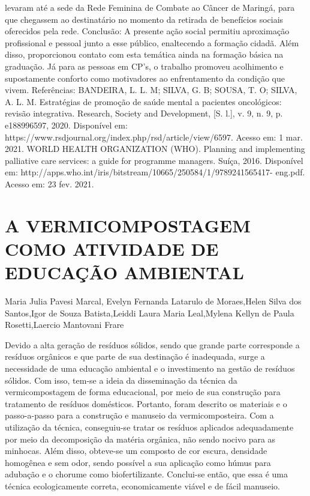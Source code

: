 levaram até a sede da Rede Feminina de Combate ao Câncer de Maringá, para que chegassem ao
destinatário no momento da retirada de benefícios sociais oferecidos pela rede. Conclusão: A
presente ação social permitiu aproximação profissional e pessoal junto a esse público,
enaltecendo a formação cidadã. Além disso, proporcionou contato com esta temática ainda na
formação básica na graduação. Já para as pessoas em CP’s, o trabalho promoveu acolhimento e
supostamente conforto como motivadores ao enfrentamento da condição que vivem.
Referências:
BANDEIRA, L. L. M; SILVA, G. B; SOUSA, T. O; SILVA, A. L. M. Estratégias de promoção
de saúde mental a pacientes oncológicos: revisão integrativa. Research, Society and
Development, [S. l.], v. 9, n. 9, p. e188996597, 2020. Disponível em:
https://www.rsdjournal.org/index.php/rsd/article/view/6597. Acesso em: 1 mar. 2021.
WORLD HEALTH ORGANIZATION (WHO). Planning and implementing palliative care
services: a guide for programme managers. Suíça, 2016. Disponível em:
http://apps.who.int/iris/bitstream/10665/250584/1/9789241565417- eng.pdf. Acesso em: 23 fev.
2021.



\section{A VERMICOMPOSTAGEM COMO ATIVIDADE DE EDUCAÇÃO AMBIENTAL}

Maria Julia Pavesi Marcal, Evelyn Fernanda Latarulo de Moraes,Helen Silva dos Santos,Igor de Souza Batista,Leiddi Laura Maria Leal,Mylena Kellyn de Paula Rosetti,Laercio Mantovani Frare

Devido a alta geração de resíduos sólidos, sendo que grande parte corresponde a resíduos orgânicos e que parte de sua destinação é inadequada, surge a necessidade de uma educação ambiental e o investimento na gestão de resíduos sólidos. Com isso, tem-se a ideia da disseminação da técnica da vermicompostagem de forma educacional, por meio de sua construção para tratamento de  resíduos domésticos. Portanto, foram descrito os materiais e o passo-a-passo para a construção e manuseio da vermicomposteira. Com a utilização da técnica, conseguiu-se tratar os resíduos aplicados adequadamente por meio da decomposição da matéria orgânica, não sendo nocivo para as minhocas. Além disso, obteve-se um  composto de cor escura, densidade homogênea e sem odor, sendo possível a sua aplicação como húmus para adubação e o chorume como biofertilizante. Conclui-se então, que essa é uma técnica ecologicamente correta, economicamente viável e de fácil manuseio. 

